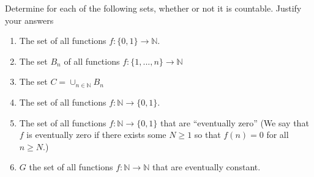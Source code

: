   \begin{exercise}
    Determine for each of the following sets, whether or not it is countable. Justify your answers
    \begin{enumerate}
      \item The set of all functions $f : \{0,1\} \to \mathbb{N}$.
      \item The set $B_n$ of all functions $f : \{1,...,n\} \to \mathbb{N}$
      \item The set $C = \cup_{n\in\mathbb{N}}B_n$
      \item The set of all functions $f : \mathbb{N} \to \{0,1\}$.
      \item The set of all functions $f : \mathbb{N} \to \{0,1\}$ that are ``eventually zero''
        (We say that $f$ is eventually zero if there exists some $N \geq 1$ so that
        $f(n) = 0$ for all $n \geq N$.)
      \item $G$ the set of all functions $f : \mathbb{N} \to \mathbb{N}$ that are eventually constant.
    \end{enumerate}
  \end{exercise} 
